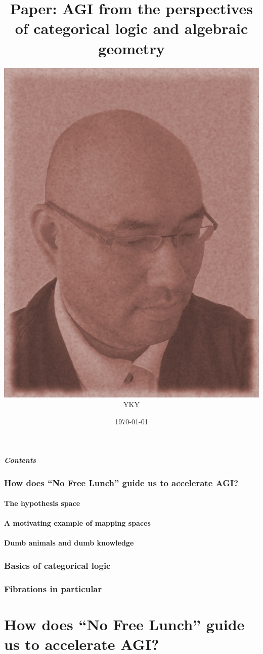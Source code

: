 \documentclass[16pt]{beamer}
\title[AGI and categorical logic]{{Paper: AGI from the perspectives of categorical logic and algebraic geometry}}
\author{\includegraphics[scale=0.14]{John_Grothendieck.png} \\ \centering YKY}
\date{\today} %
\newcommand{\smiley}{$\vcenter{\hbox{\texttt{[image: ../smiling-face.png]}}}$}
\begin{document}
\addtocounter{page}{-1}
\begin{frame}
\titlepage
\end{frame}

\addtocounter{page}{-1}
\begin{frame}[noframenumbering]
\frametitle{Contents}
\tableofcontents
\end{frame}


\section{How does ``No Free Lunch'' guide us to accelerate AGI?}
\subsection{The hypothesis space}
\subsection{A motivating example of mapping spaces}
\subsection{Dumb animals and dumb knowledge}
\section{Basics of categorical logic}
\section{Fibrations in particular}

\part{How does ``No Free Lunch'' guide us to accelerate AGI?}
\frame{\partpage}
\end{document}
